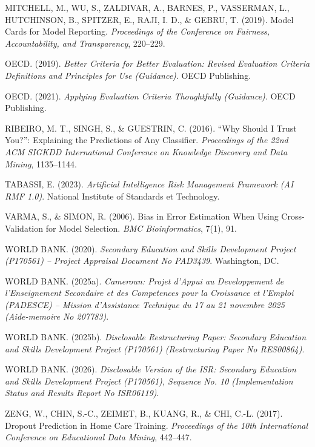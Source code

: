 \documentclass[12pt,a4paper,twoside,openany]{report}
\begin{document}
\begin{description}[leftmargin=0cm, itemsep=0.5em]
\item MITCHELL, M., WU, S., ZALDIVAR, A., BARNES, P., VASSERMAN, L., HUTCHINSON, B., SPITZER, E., RAJI, I. D., \& GEBRU, T. (2019). Model Cards for Model Reporting. \textit{Proceedings of the Conference on Fairness, Accountability, and Transparency}, 220--229.

\item OECD. (2019). \textit{Better Criteria for Better Evaluation: Revised Evaluation Criteria Definitions and Principles for Use (Guidance)}. OECD Publishing.

\item OECD. (2021). \textit{Applying Evaluation Criteria Thoughtfully (Guidance)}. OECD Publishing.

\item RIBEIRO, M. T., SINGH, S., \& GUESTRIN, C. (2016). ``Why Should I Trust You?'': Explaining the Predictions of Any Classifier. \textit{Proceedings of the 22nd ACM SIGKDD International Conference on Knowledge Discovery and Data Mining}, 1135--1144.

\item TABASSI, E. (2023). \textit{Artificial Intelligence Risk Management Framework (AI RMF 1.0)}. National Institute of Standards et Technology.

\item VARMA, S., \& SIMON, R. (2006). Bias in Error Estimation When Using Cross-Validation for Model Selection. \textit{BMC Bioinformatics}, 7(1), 91.

\item WORLD BANK. (2020). \textit{Secondary Education and Skills Development Project (P170561) -- Project Appraisal Document No PAD3439}. Washington, DC.

\item WORLD BANK. (2025a). \textit{Cameroun: Projet d'Appui au Developpement de l'Enseignement Secondaire et des Competences pour la Croissance et l'Emploi (PADESCE) -- Mission d'Assistance Technique du 17 au 21 novembre 2025 (Aide-memoire No 207783)}.

\item WORLD BANK. (2025b). \textit{Disclosable Restructuring Paper: Secondary Education and Skills Development Project (P170561) (Restructuring Paper No RES00864)}.

\item WORLD BANK. (2026). \textit{Disclosable Version of the ISR: Secondary Education and Skills Development Project (P170561), Sequence No. 10 (Implementation Status and Results Report No ISR06119)}.

\item ZENG, W., CHIN, S.-C., ZEIMET, B., KUANG, R., \& CHI, C.-L. (2017). Dropout Prediction in Home Care Training. \textit{Proceedings of the 10th International Conference on Educational Data Mining}, 442--447.

\end{description}

\newpage


\tableofcontents
\end{document}
